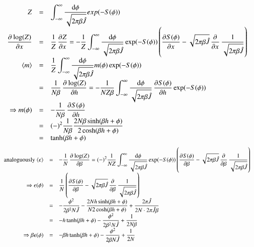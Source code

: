 \documentclass{scrartcl}
\begin{document}
\[\begin{array}{>{\displaystyle}r>{\displaystyle}c>{\displaystyle}l}

Z&=&\int_{-\infty}^{\infty}\frac{\mathrm{d} \phi}{\sqrt{2\pi\beta\hat{J}}}exp(-S(\phi))\\


\dpd{\log(Z)}{x}&=&\frac{1}{Z}\dpd{Z}{x}=
-\frac{1}{Z}\int_{-\infty}^{\infty}\frac{\mathrm{d} \phi}{\sqrt{2\pi\beta\hat{J}}}\exp(-S(\phi))%
\left( \dpd{S(\phi)}{x}-\sqrt{2\pi\beta\hat{J}}\dpd{}{x}\frac{1}{\sqrt{2\pi\beta\hat{J}}}\right) \\

\langle m\rangle&=&\frac{1}{Z}\int_{-\infty}^{\infty}\frac{\mathrm{d} \phi}{\sqrt{2\pi\beta\hat{J}}}m(\phi)\exp(-S(\phi))\\
&=&\frac{1}{N\beta}\dpd{\log(Z)}{h}=
-\frac{1}{NZ\beta}\int_{-\infty}^{\infty}\frac{\mathrm{d} \phi}{\sqrt{2\pi\beta\hat{J}}}\dpd{S(\phi)}{h}\exp(-S(\phi))\\

\Rightarrow m(\phi)&=&-\frac{1}{N\beta}\dpd{S(\phi)}{h}\\
&=&(-)^2\frac{1}{N\beta}\frac{2N\beta\sinh(\beta h+\phi)}{2\cosh(\beta h+\phi)}\\
&=&\tanh(\beta h+\phi)\\


\end{array}\]
\[\begin{array}{>{\displaystyle}r>{\displaystyle}c>{\displaystyle}l}

\text{analoguously } \langle \epsilon\rangle&=&-\frac{1}{N}\dpd{\log(Z)}{\beta}=
(-)^2\frac{1}{NZ}\int_{-\infty}^{\infty}\frac{\mathrm{d} \phi}{\sqrt{2\pi\beta\hat{J}}}\exp(-S(\phi))%
\left( \dpd{S(\phi)}{\beta}-\sqrt{2\pi\beta\hat{J}}\dpd{}{\beta}\frac{1}{\sqrt{2\pi\beta\hat{J}}}\right)\\

\Rightarrow \epsilon(\phi)&=&\frac{1}{N}\left( \dpd{S(\phi)}{\beta}-\sqrt{2\pi\beta\hat{J}}\dpd{}{\beta}\frac{1}{\sqrt{2\pi\beta\hat{J}}}\right)\\
&=&-\frac{\phi^2}{2\beta^2 N\hat{J}}-\frac{2Nh\sinh(\beta h+\phi)}{N2\cosh(\beta h+\phi)}+\frac{2\pi\hat{J}}{2N\cdot2\pi\hat{J}\beta}\\

&=&-h\tanh(\beta h+\phi)-\frac{\phi^2}{2\beta^2 N\hat{J}}+\frac{1}{2N\beta}\\

\Rightarrow \beta\epsilon(\phi)&=&-\beta h\tanh(\beta h+\phi)-\frac{\phi^2}{2\beta N\hat{J}}+\frac{1}{2N}\\

\end{array}\]
\end{document}
